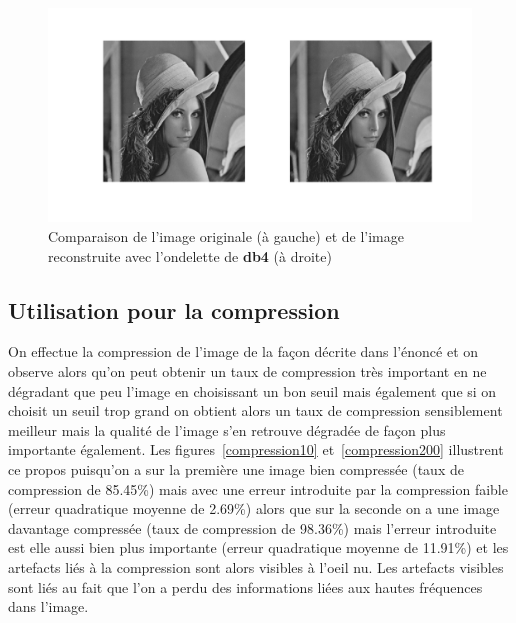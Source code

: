 \documentclass[12pt]{article}
\begin{document}
\begin{figure}[H]
	\centering
	\hspace*{-2.15cm}
	\includegraphics[width = 1.2\textwidth]{images/3-1-reconstruction-db4}	\captionsetup{justification=centering}
	\caption{Comparaison de l'image originale (à gauche) et de l'image reconstruite avec l'ondelette de \textbf{db4} (à droite)}
	\label{reconstructiondb4}
\end{figure}

\subsection{Utilisation pour la compression}

On effectue la compression de l'image de la façon décrite dans l'énoncé et on observe
alors qu'on peut obtenir un taux de compression très important en ne dégradant que peu
l'image en choisissant un bon seuil mais également que si on choisit un seuil trop grand
on obtient alors un taux de compression sensiblement meilleur mais la qualité de l'image
s'en retrouve dégradée de façon plus importante également. Les
figures~\ref{compression10} et~\ref{compression200} illustrent ce propos puisqu'on a sur
la première une image bien compressée (taux de compression de 85.45\%) mais avec une
erreur introduite par la compression faible (erreur quadratique moyenne de 2.69\%) alors
que sur la seconde on a une image davantage compressée (taux de compression de 98.36\%)
mais l'erreur introduite est elle aussi bien plus importante (erreur quadratique
moyenne de 11.91\%) et les artefacts liés à la compression sont alors visibles à l'oeil
nu. Les artefacts visibles sont liés au fait que l'on a perdu des informations liées
aux hautes fréquences dans l'image.
\end{document}
